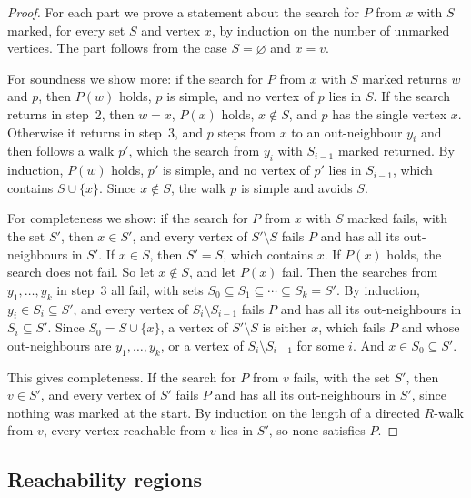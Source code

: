 \begin{proof}
  \leanok
  For each part we prove a statement about the search for $P$ from $x$
  with $S$ marked, for every set $S$ and vertex $x$, by induction on
  the number of unmarked vertices. The part follows from the case
  $S = \varnothing$ and $x = v$.

  For soundness we show more: if the search for $P$ from $x$ with $S$
  marked returns $w$ and $p$, then $P(w)$ holds, $p$ is simple, and
  no vertex of $p$ lies in $S$. If the search returns in step~2, then
  $w = x$, $P(x)$ holds, $x \notin S$, and $p$ has the single vertex
  $x$. Otherwise it returns in step~3, and $p$ steps from $x$ to an
  out-neighbour $y_i$ and then follows a walk $p'$, which the search
  from $y_i$ with $S_{i-1}$ marked returned. By induction, $P(w)$
  holds, $p'$ is simple, and no vertex of $p'$ lies in $S_{i-1}$, which
  contains $S \cup \{x\}$. Since $x \notin S$, the walk $p$ is simple
  and avoids $S$.

  For completeness we show: if the search for $P$ from $x$ with $S$
  marked fails, with the set $S'$, then $x \in S'$, and every vertex
  of $S' \setminus S$ fails $P$ and has all its out-neighbours in $S'$.
  If $x \in S$, then $S' = S$, which contains $x$. If $P(x)$ holds, the
  search does not fail. So let $x \notin S$, and let $P(x)$ fail. Then
  the searches from $y_1, \ldots, y_k$ in step~3 all fail, with sets
  $S_0 \subseteq S_1 \subseteq \cdots \subseteq S_k = S'$. By
  induction, $y_i \in S_i \subseteq S'$, and every vertex of
  $S_i \setminus S_{i-1}$ fails $P$ and has all its out-neighbours in
  $S_i \subseteq S'$. Since $S_0 = S \cup \{x\}$, a vertex of
  $S' \setminus S$ is either $x$, which fails $P$ and whose
  out-neighbours are $y_1, \ldots, y_k$, or a vertex of
  $S_i \setminus S_{i-1}$ for some $i$. And $x \in S_0 \subseteq S'$.

  This gives completeness. If the search for $P$ from $v$ fails, with
  the set $S'$, then $v \in S'$, and every vertex of $S'$ fails $P$ and
  has all its out-neighbours in $S'$, since nothing was marked at the
  start. By induction on the length of a directed $R$-walk from $v$,
  every vertex reachable from $v$ lies in $S'$, so none satisfies
  $P$.
\end{proof}

\subsection{Reachability regions}
\label{ssec:reach-closure-computable}

